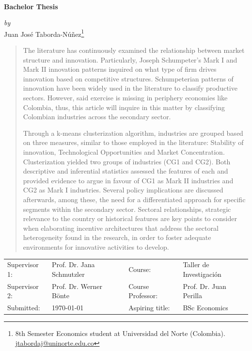 \documentclass[12pt,a4paper]{article}
\begin{document}
\begin{titlepage}
\begin{center}
	 \\
	\vspace{0.75em}
	\textbf{\large{Bachelor Thesis}} \\
\end{center}
\begin{center}
	\textit{by} \\
	\large{Juan José Taborda-Núñez}\footnote{8th Semester Economics student at Universidad del Norte (Colombia). \href{mailto:jtabordaj@uninorte.edu.co}{jtabordaj@uninorte.edu.co}}
\end{center}


\vspace*{\fill}
\begin{abstract}
The literature has continuously examined the relationship between market structure and innovation. Particularly, Joseph Schumpeter’s Mark I and Mark II innovation patterns inquired on what type of firm drives innovation based on competitive structures. Schumpeterian patterns of innovation have been widely used in the literature to classify productive sectors. However, said exercise is missing in periphery economies like Colombia, thus, this article will inquire in this matter by classifying Colombian industries across the secondary sector. 

Through a k-means clusterization algorithm, industries are grouped based on three measures, similar to those employed in the literature: Stability of innovation, Technological Opportunities and Market Concentration. Clusterization yielded two groups of industries (CG1 and CG2). Both descriptive and inferential statistics assessed the features of each and provided evidence to argue in favour of CG1 as Mark II industries and CG2 as Mark I industries. Several policy implications are discussed afterwards, among these, the need for a differentiated approach for specific segments within the secondary sector. Sectoral relationships, strategic relevance to the country or historical features are key points to consider when elaborating incentive architectures that address the sectoral heterogeneity found in the research, in order to foster adequate environments for innovative activities to develop. 
\end{abstract}

\vspace*{\fill}
	\vfill{
		\normalsize
		\flushleft
		\begin{tabular}{@{\qquad}llll}
			Supervisor 1: & Prof. Dr. Jana Schmutzler & Course: & Taller de Investigación \\
			Supervisor 2: & Prof. Dr. Werner Bönte & Course Professor: & Prof. Dr. Juan Perilla \\
			Submitted: & \today & Aspiring title: & BSc Economics
		\end{tabular}
	}
\vspace*{\fill}
\end{titlepage}
\end{document}
